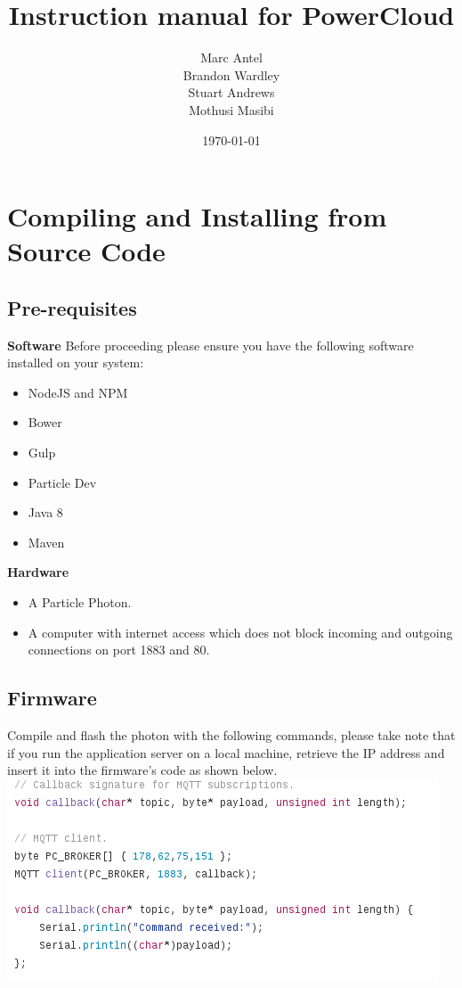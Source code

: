 \documentclass[a4paper,10pt]{article}
\title{Instruction manual for PowerCloud}
\author{Marc Antel\\ Brandon Wardley\\ Stuart Andrews\\ Mothusi Masibi}
\date{\today}
\begin{document}
		\maketitle
		\newpage
	\section{Compiling and Installing from Source Code}
		\subsection{Pre-requisites}
			\textbf{Software}
			Before proceeding please ensure you have the following software installed on your system:
			\begin{itemize}
				\item NodeJS and NPM
				\item Bower
				\item Gulp
				\item Particle Dev
				\item Java 8
				\item Maven
			\end{itemize}
			
			\textbf{Hardware}
			\begin{itemize}
				\item A Particle Photon.
				\item A computer with internet access which does not block incoming and outgoing connections on port 1883 and 80.
			\end{itemize}
			
		\subsection{Firmware}
			Compile and flash the photon with the following commands, please take note that if you run the application server on a local machine, retrieve the IP address and insert it into the firmware's code as shown below.\\
			
				\includegraphics[scale=0.5]{firmware.png}
\end{document}
